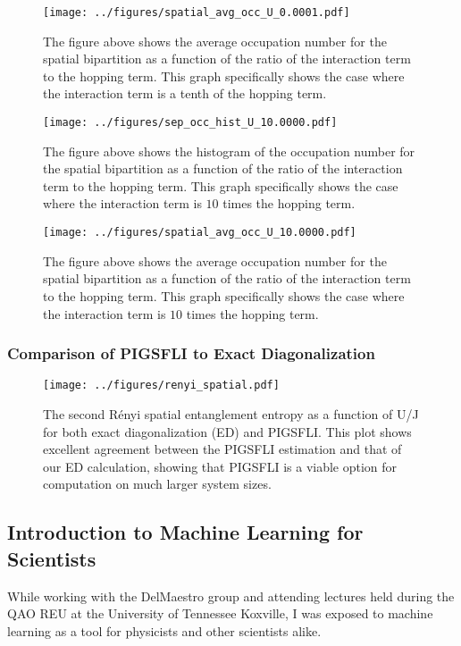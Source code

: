 \begin{figure}[H]
\centering
\texttt{[image: ../figures/spatial\_avg\_occ\_U\_0.0001.pdf]}
\caption{The figure above shows the average occupation number for the spatial bipartition as a function of the ratio of the interaction term to the hopping term. This graph specifically shows the case where the interaction term is a tenth of the hopping term.}
\label{fig:spatial_avg_occ_U_0.0001}
\end{figure}

\begin{figure}[H]
\centering
\texttt{[image: ../figures/sep\_occ\_hist\_U\_10.0000.pdf]}
\caption{The figure above shows the histogram of the occupation number for the spatial bipartition as a function of the ratio of the interaction term to the hopping term. This graph specifically shows the case where the interaction term is $10$ times the hopping term.}
\label{fig:spatial_occ_hist_U_10.0000}
\end{figure}

\begin{figure}[H]
\centering
\texttt{[image: ../figures/spatial\_avg\_occ\_U\_10.0000.pdf]}
\caption{The figure above shows the average occupation number for the spatial bipartition as a function of the ratio of the interaction term to the hopping term. This graph specifically shows the case where the interaction term is $10$ times the hopping term.}
\label{fig:spatial_avg_occ_U_10.0000}    
\end{figure}


\subsubsection{Comparison of PIGSFLI to Exact Diagonalization} \label{results}
\begin{figure}[H]
\centering
\texttt{[image: ../figures/renyi\_spatial.pdf]}
\caption{The second Rényi spatial entanglement entropy as a function of U/J for both exact diagonalization (ED) and PIGSFLI. This plot shows excellent agreement between the PIGSFLI estimation and that of our ED calculation, showing that PIGSFLI is a viable option for computation on much larger system sizes.}
\label{fig:renyi_spatial}
\end{figure}

\subsection{Introduction to Machine Learning for Scientists}
While working with the DelMaestro group and attending lectures held during the QAO REU at the University of Tennessee Koxville, I was exposed to machine learning as a tool for physicists and other scientists alike. 

